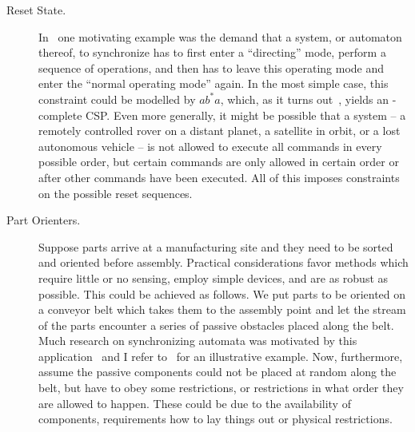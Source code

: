 %



\begin{description}

\item[Reset State.] %

In~\cite{DBLP:conf/mfcs/FernauGHHVW19} one motivating example was the demand that a system, or automaton thereof, to synchronize has to first enter a ``directing'' mode, perform a sequence of
operations, and then has to leave this operating mode and enter the ``normal
operating mode'' again. In the most simple case, this constraint
could be modelled by $ab^*a$, which, as it turns out~\cite{DBLP:conf/mfcs/FernauGHHVW19},
yields an \NP-complete CSP.
Even more generally, it might be possible that a system -- a remotely controlled
rover on a distant planet, a satellite in orbit, or a lost autonomous vehicle
-- is not allowed to execute all commands in every possible
order, but  certain commands are only allowed in certain order or after
other commands have been executed. All of this imposes constraints
on the possible reset sequences.


\item[Part Orienters.] Suppose parts arrive at a manufacturing site and they
need to be sorted and oriented before assembly. Practical considerations
favor methods which require little or no sensing, employ simple devices,
and are as robust as possible. This could be achieved as follows.
We put parts to be oriented on a conveyor belt which takes them to the assembly
point and let the stream of the parts encounter a series of passive obstacles placed along
the belt. Much research on synchronizing automata was motivated
by this application~\cite{DBLP:journals/algorithmica/ChenI95,DBLP:journals/siamcomp/Eppstein90,DBLP:journals/trob/ErdmannM88,DBLP:journals/algorithmica/Goldberg93,DBLP:conf/focs/Natarajan86,DBLP:journals/ijrr/Natarajan89,Vol2008}
and I refer to~\cite{Vol2008} for
an illustrative example. 
Now, furthermore, assume the passive components could not be placed at random along
the belt, but have to obey some restrictions, or restrictions
in what order they are allowed to happen. These could be due
to the availability of components, requirements how to lay things out
or physical restrictions. %




\end{description}
